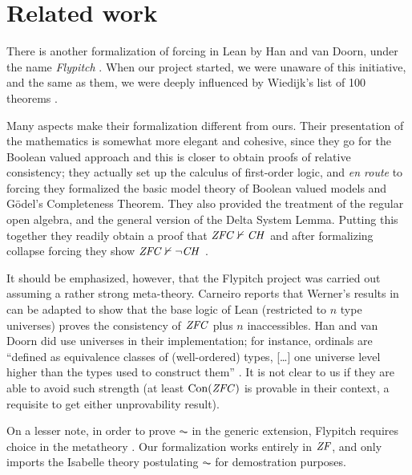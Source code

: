 \section{Related work}
\label{sec:related-work}

There is another formalization of forcing in Lean by Han and van
Doorn, under the name \emph{Flypitch} \cite{han_et_al:LIPIcs:2019:11074,DBLP:conf/cpp/HanD20}. When our project started, we
were unaware of this initiative, and the same as them, we were deeply
influenced by Wiedijk's list of 100 theorems \cite{Formalizing100}.

Many aspects make their formalization different from ours. Their
presentation of the mathematics is somewhat more elegant and cohesive,
since they go for the Boolean valued approach and this is closer to
obtain proofs of relative consistency; they actually set up the
calculus of first-order logic, and \emph{en route} to forcing they
formalized the basic model theory of Boolean valued models and Gödel's
Completeness Theorem. They also provided the treatment of the regular
open algebra, and the general version of the Delta System
Lemma. Putting this together they readily obtain a proof that
$\mathit{ZFC}\nvdash \mathit{CH}$ \cite{han_et_al:LIPIcs:2019:11074} and after
formalizing collapse forcing they show  $\mathit{ZFC}\nvdash \neg\mathit{CH}$
\cite[Sect.~5.6]{DBLP:conf/cpp/HanD20}.

It should be emphasized, however, that the Flypitch project was
carried out assuming a rather strong meta-theory. 
Carneiro \cite{carneiro-ms-thesis} reports that Werner's results in
\cite{10.5555/645869.668660} can be adapted to show that the base
logic  of Lean (restricted to $n$
type universes) proves the consistency of $\mathit{ZFC}$ plus $n$
inaccessibles. Han and van Doorn did use universes in their
implementation; for instance, ordinals are “defined as equivalence
classes of (well-ordered) types, [\dots] one
universe level higher than the types used to construct them”
\cite{han_et_al:LIPIcs:2019:11074}. It is not clear to us if they are
able to avoid such strength (at least $\operatorname{Con}(\mathit{ZFC})$ is provable in
their context, a requisite to get either unprovability result).

On a lesser note, in order to prove $\AC$ in the generic extension,
Flypitch requires choice in the metatheory
\cite[p.~11]{han_et_al:LIPIcs:2019:11074}. Our formalization works
entirely in $\mathit{ZF}$, and only imports the Isabelle theory postulating
$\AC$ for demostration purposes.


